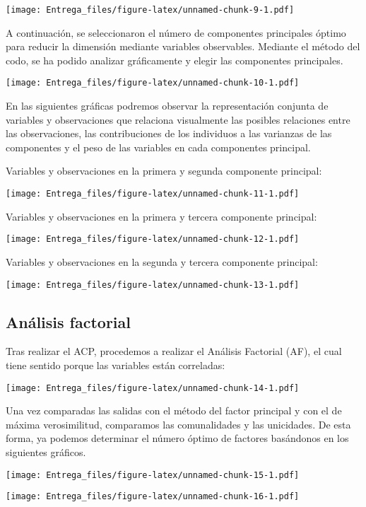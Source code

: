 \documentclass[
]{scrreprt}
\begin{document}
\texttt{[image: Entrega\_files/figure-latex/unnamed-chunk-9-1.pdf]}

A continuación, se seleccionaron el número de componentes principales
óptimo para reducir la dimensión mediante variables observables.
Mediante el método del codo, se ha podido analizar gráficamente y elegir
las componentes principales.

\texttt{[image: Entrega\_files/figure-latex/unnamed-chunk-10-1.pdf]}

En las siguientes gráficas podremos observar la representación conjunta
de variables y observaciones que relaciona visualmente las posibles
relaciones entre las observaciones, las contribuciones de los individuos
a las varianzas de las componentes y el peso de las variables en cada
componentes principal.

Variables y observaciones en la primera y segunda componente principal:

\texttt{[image: Entrega\_files/figure-latex/unnamed-chunk-11-1.pdf]}

Variables y observaciones en la primera y tercera componente principal:

\texttt{[image: Entrega\_files/figure-latex/unnamed-chunk-12-1.pdf]}

Variables y observaciones en la segunda y tercera componente principal:

\texttt{[image: Entrega\_files/figure-latex/unnamed-chunk-13-1.pdf]}

\hypertarget{anuxe1lisis-factorial}{%
\subsection{Análisis factorial}\label{anuxe1lisis-factorial}}

Tras realizar el ACP, procedemos a realizar el Análisis Factorial (AF),
el cual tiene sentido porque las variables están correladas:

\texttt{[image: Entrega\_files/figure-latex/unnamed-chunk-14-1.pdf]}

Una vez comparadas las salidas con el método del factor principal y con
el de máxima verosimilitud, comparamos las comunalidades y las
unicidades. De esta forma, ya podemos determinar el número óptimo de
factores basándonos en los siguientes gráficos.

\texttt{[image: Entrega\_files/figure-latex/unnamed-chunk-15-1.pdf]}

\texttt{[image: Entrega\_files/figure-latex/unnamed-chunk-16-1.pdf]}
\end{document}
